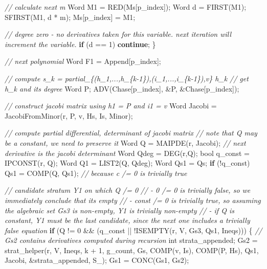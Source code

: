 \documentclass[
]{book}
\newenvironment{Shaded}{\begin{snugshade}}{\end{snugshade}}
\newcommand{\CommentTok}[1]{\textcolor[rgb]{0.56,0.35,0.01}{\textit{#1}}}
\newcommand{\ControlFlowTok}[1]{\textcolor[rgb]{0.13,0.29,0.53}{\textbf{#1}}}
\newcommand{\DataTypeTok}[1]{\textcolor[rgb]{0.13,0.29,0.53}{#1}}
\newcommand{\DecValTok}[1]{\textcolor[rgb]{0.00,0.00,0.81}{#1}}
\newcommand{\NormalTok}[1]{#1}
\theoremstyle{definition}
\theoremstyle{definition}
\theoremstyle{definition}
\theoremstyle{definition}
\theoremstyle{remark}
\begin{document}
\begin{Shaded}
\begin{Highlighting}[numbers=left,,]
            \CommentTok{// calculate next m}
\NormalTok{            Word M1 = RED(Ms[p\_index]);}
\NormalTok{            Word d = FIRST(M1);}
\NormalTok{            SFIRST(M1, d * m);}
\NormalTok{            Ms[p\_index] = M1;}

            \CommentTok{// degree zero {-} no derivatives taken for this variable. next iteration will increment the variable.}
            \ControlFlowTok{if}\NormalTok{ (d == }\DecValTok{1}\NormalTok{) }\ControlFlowTok{continue}\NormalTok{;}
\NormalTok{        \}}

        \CommentTok{// next polynomial}
\NormalTok{        Word F1 = Append[p\_index];}

        \CommentTok{// compute s\_k = partial\_\{(h\_1,...,h\_\{k{-}1\}),(i\_1,...,i\_\{k{-}1\}),v\} h\_k}
        \CommentTok{// get h\_k and its degree}
\NormalTok{        Word P;}
\NormalTok{        ADV(Chase[p\_index], \&P, \&Chase[p\_index]);}

        \CommentTok{// construct jacobi matrix using h1 = P and i1 = v}
\NormalTok{        Word Jacobi = JacobiFromMinor(r, P, v, Hs, Is, Minor);}

        \CommentTok{// compute partial differential, determinant of jacobi matrix}
        \CommentTok{// note that Q may be a constant, we need to preserve it}
\NormalTok{        Word Q = MAIPDE(r, Jacobi); }\CommentTok{// next derivative is the jacobi determinant}
\NormalTok{        Word Qdeg = DEG(r,Q);}
        \DataTypeTok{bool}\NormalTok{ q\_const = IPCONST(r, Q);}
\NormalTok{        Word Q1 = LIST2(Q, Qdeg);}
\NormalTok{        Word Qs1 = Qs;}
        \ControlFlowTok{if}\NormalTok{ (!q\_const) Qs1 = COMP(Q, Qs1); }\CommentTok{// because c /= 0 is trivially true}

        \CommentTok{// candidate stratum Y1 on which Q /= 0}
        \CommentTok{//   {-} 0 /= 0 is trivially false, so we immediately conclude that it\textquotesingle{}s empty}
        \CommentTok{//   {-} const /= 0 is trivially true, so assuming the algebraic set Gs3 is non{-}empty, Y1 is trivially non{-}empty}
        \CommentTok{//   {-} if Q is constant, Y1 must be the last candidate, since the next one includes a trivially false equation}
        \ControlFlowTok{if}\NormalTok{ (Q != }\DecValTok{0}\NormalTok{ \&\& (q\_const || !ISEMPTY(r, V, Gs3, Qs1, Ineqs))) \{}
            \CommentTok{// Gs2 contains derivatives computed during recursion}
            \DataTypeTok{int}\NormalTok{ strata\_appended;}
\NormalTok{            Gs2 = strat\_helper(r, V, Ineqs, k + }\DecValTok{1}\NormalTok{, g\_count, Gs, COMP(v, Is), COMP(P, Hs), Qs1, Jacobi, \&strata\_appended, S\_);}
\NormalTok{            Gs1 = CONC(Gs1, Gs2);}


\end{Highlighting}
\end{Shaded}
\end{document}
